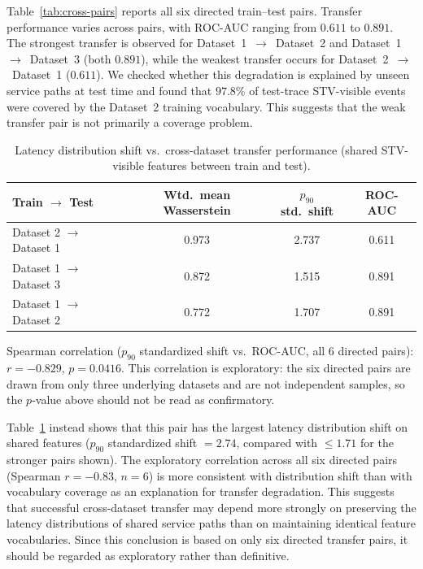 \documentclass[informatics,article,submit,moreauthors]{Definitions/mdpi}
\newcommand{\rev}[1]{{\color{revisionblue}#1}}
\begin{document}
Table~\ref{tab:cross-pairs} reports all six directed train--test pairs.
Transfer performance varies across pairs, with ROC-AUC ranging from
\(0.611\) to \(0.891\). The strongest transfer is observed for
Dataset~1~\(\rightarrow\)~Dataset~2 and Dataset~1~\(\rightarrow\)~Dataset~3
(both \(0.891\)), while the weakest transfer occurs for
Dataset~2~\(\rightarrow\)~Dataset~1 (\(0.611\)). We checked whether this degradation is explained by
unseen service paths at test time and found that \(97.8\%\) of
test-trace STV-visible events were covered by the Dataset~2 training
vocabulary. This suggests that the weak transfer pair is not primarily a
coverage problem.
\begin{table}[t]
	\centering
	\caption{Latency distribution shift vs.\ cross-dataset transfer performance
		(shared STV-visible features between train and test).}
	\label{tab:distribution-shift}
	\begin{tabular}{lccc}
		\toprule
		\textbf{Train $\rightarrow$ Test} & \textbf{Wtd.\ mean Wasserstein} & \textbf{$p_{90}$ std.\ shift} & \textbf{ROC-AUC} \\
		\midrule
		Dataset 2 $\rightarrow$ Dataset 1 & 0.973 & 2.737 & 0.611 \\
		Dataset 1 $\rightarrow$ Dataset 3 & 0.872 & 1.515 & 0.891 \\
		Dataset 1 $\rightarrow$ Dataset 2 & 0.772 & 1.707 & 0.891 \\
		\bottomrule
	\end{tabular}

	\vspace{4pt}
	\footnotesize
	Spearman correlation ($p_{90}$ standardized shift vs.\ ROC-AUC, all 6
	directed pairs): $r = -0.829$, $p = 0.0416$. \rev{This correlation is
	exploratory: the six directed pairs are drawn from only three
	underlying datasets and are not independent samples, so the
	$p$-value above should not be read as confirmatory.}
\end{table}

Table~\ref{tab:distribution-shift} instead shows that this pair has the
largest latency distribution shift on shared features
(\(p_{90}\) standardized shift \(=2.74\), compared with
\(\leq 1.71\) for the stronger pairs shown). The exploratory correlation
across all six directed pairs (Spearman \(r=-0.83\), \(n=6\)) is more
consistent with distribution shift than with vocabulary coverage as an
explanation for transfer degradation. This suggests that successful
cross-dataset transfer may depend more strongly on preserving the
latency distributions of shared service paths than on maintaining
identical feature vocabularies. Since this conclusion is based on only
six directed transfer pairs, it should be regarded as exploratory rather
than definitive.
\end{document}
